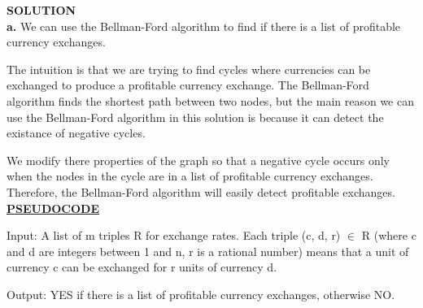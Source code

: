 \documentclass[11pt]{csc_assignment}
\begin{document}
\begin{description}

\newpage
\item[Q1.]

\textbf{SOLUTION}
\\

\textbf{a.} We can use the Bellman-Ford algorithm to find if there is a list of profitable currency exchanges.

The intuition is that we are trying to find cycles where currencies can be exchanged to produce a profitable currency exchange. The Bellman-Ford algorithm finds the shortest path between two nodes, but the main reason we can use the Bellman-Ford algorithm in this solution is because it can detect the existance of negative cycles.

We modify there properties of the graph so that a negative cycle occurs only when the nodes in the cycle are in a list of profitable currency exchanges. Therefore, the Bellman-Ford algorithm will easily detect profitable exchanges. \\

\underline{\textbf{PSEUDOCODE}}

Input: A list of m triples R for exchange rates. Each triple (c, d, r) $\in$ R (where c and d are integers between 1 and n, r is a rational number) means that a unit of currency c can be exchanged for r units of currency d.

Output: YES if there is a list of profitable currency exchanges, otherwise NO.\\


\end{description}
\end{document}
